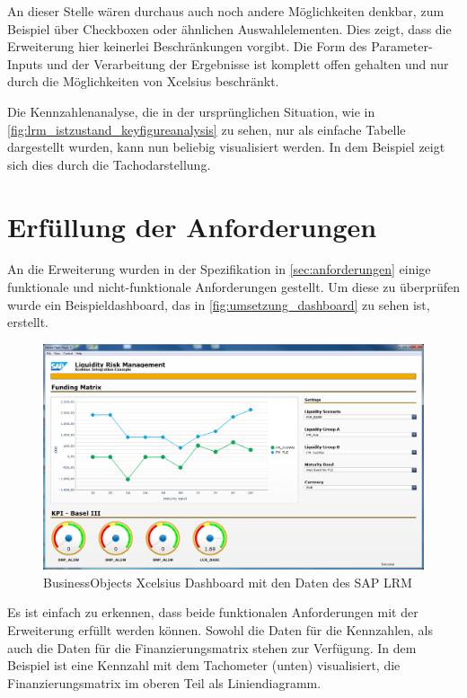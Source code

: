 \begin{onehalfspacing}
An dieser Stelle wären durchaus auch noch andere Möglichkeiten denkbar, zum Beispiel über Checkboxen oder ähnlichen Auswahlelementen. Dies zeigt, dass die Erweiterung hier keinerlei Beschränkungen vorgibt. Die Form des Parameter-Inputs und der Verarbeitung der Ergebnisse ist komplett offen gehalten und nur durch die Möglichkeiten von Xcelsius beschränkt.

Die Kennzahlenanalyse, die in der ursprünglichen Situation, wie in \vref{fig:lrm_istzustand_keyfigureanalysis} zu sehen, nur als einfache Tabelle dargestellt wurden, kann nun beliebig visualisiert werden. In dem Beispiel zeigt sich dies durch die Tachodarstellung.


\section{Erfüllung der Anforderungen}
An die Erweiterung wurden in der Spezifikation in \vref{sec:anforderungen} einige funktionale und nicht-funktionale Anforderungen gestellt. Um diese zu überprüfen wurde ein Beispieldashboard, das in \vref{fig:umsetzung_dashboard} zu sehen ist, erstellt.

\begin{figure}[!ht]
\centering
\setlength{\unitlength}{1mm}
\includegraphics[width=15cm]{images/dashboard_preview.PNG}
\caption{BusinessObjects Xcelsius Dashboard mit den Daten des SAP LRM\label{fig:umsetzung_dashboard}}
\end{figure} 

Es ist einfach zu erkennen, dass beide funktionalen Anforderungen mit der Erweiterung erfüllt werden können. Sowohl die Daten für die Kennzahlen, als auch die Daten für die Finanzierungsmatrix stehen zur Verfügung. In dem Beispiel ist eine Kennzahl mit dem Tachometer (unten) visualisiert, die Finanzierungsmatrix im oberen Teil als Liniendiagramm.


\end{onehalfspacing}
